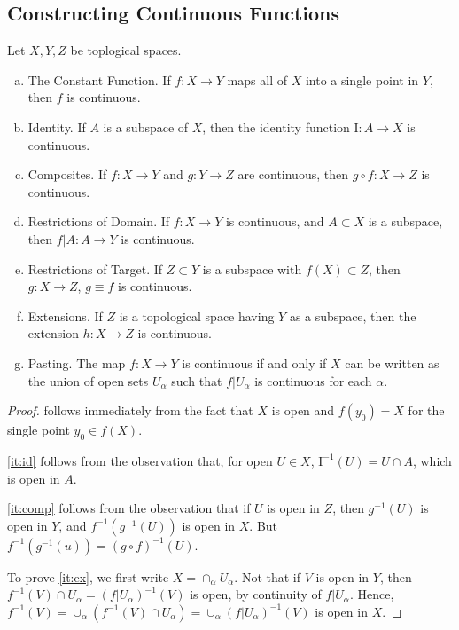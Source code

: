 \subsection{Constructing Continuous Functions}
\begin{theorem}
\label{thm:building-cont-fncs}
Let \(X,Y,Z\) be toplogical spaces.
\begin{enumerate}[(a)]
  \item{The Constant Function.}\label{it:cf} If \(f: X \to Y\) maps all of \(X\)
  into a single point in \(Y\), then \(f\) is continuous.
  \item{Identity.}\label{it:id} If \(A\) is a subspace of \(X\), then the identity function
  \(\mathrm{I}: A \to X\) is continuous.
  \item{Composites.}\label{it:comp} If \(f: X \to Y\) and \(g: Y \to Z\) are continuous, then
  \(g \circ f: X \to Z\) is continuous.
  \item{Restrictions of Domain.}\label{it:rd} If \(f: X \to Y\) is continuous, and
  \(A \subset X\) is a subspace, then \(f | A: A \to Y \) is continuous.
  \item{Restrictions of Target.}\label{it:rt} If \(Z \subset Y\) is a subspace
  with \(f(X) \subset Z\), then \(g: X \to Z \), \(g \equiv f\) is
  continuous.
  \item {Extensions.}\label{it:ex} If \(Z\) is a topological space having \(Y\) as a
  subspace, then the extension \(h: X \to Z\) is continuous.
  \item{Pasting.}\label{it:pasting} The map \(f: X \to Y\) is continuous if and only if
  \(X\) can be written as the union of open sets \(U_{\alpha}\) such that
  \(f|U_{\alpha}\) is continuous for each \(\alpha\).
\end{enumerate}
\end{theorem}
\begin{proof}
 follows immediately from the fact that \(X\) is open and
\(f(y_{0}) = X \) for the single point \(y_{0} \in f(X)\).
\par
\cref{it:id} follows from the observation that, for open \(U \in X\),
\(\mathrm{I}^{-1}(U) = U \cap A\), which is open in \(A\).
\par
\cref{it:comp}  follows from the observation that if \(U\) is open in
\(Z\), then \(g^{-1}(U)\) is open in \(Y\), and \(f^{-1}(g^{-1}(U))\) is open
in \(X\). But \(f^{-1}(g^{-1}(u)) = (g \circ f)^{-1}(U)\).
\par
To prove \cref{it:ex}, we first write \(X = \cap_{\alpha} U_{\alpha}\).
Not that if \(V\) is open in \(Y\), then
\(f^{-1}(V) \cap U_{\alpha} = (f | U_{\alpha})^{-1}(V)\) is open, by
continuity of \(f | U_{\alpha}\). Hence,
\(f^{-1}(V) = \cup_{\alpha}(f^{-1}(V) \cap U_{\alpha}) = \cup_{\alpha}
(f | U_{\alpha})^{-1}(V)\) is open in \(X\).
\end{proof}
